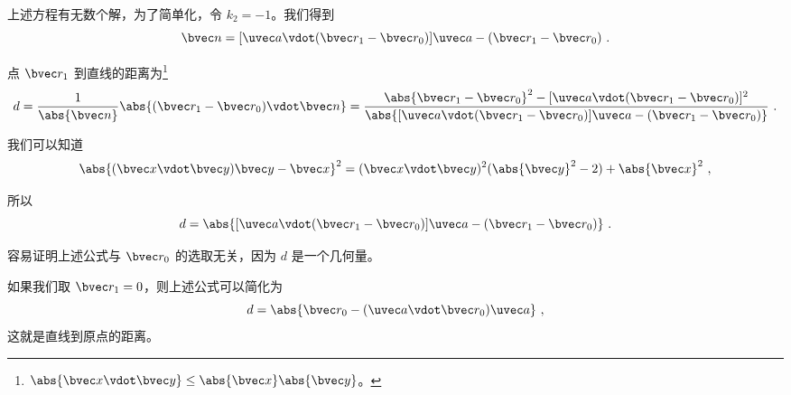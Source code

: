 上述方程有无数个解，为了简单化，令 $k_2 = -1$。我们得到
\begin{equation}
\bvec n = [\uvec a \vdot (\bvec r_1 -\bvec r_0)]\uvec a - (\bvec r_1 - \bvec r_0)~.
\end{equation}

点 $\bvec r_1$ 到直线的距离为\footnote{$\abs{\bvec x \vdot \bvec y}\leq \abs{\bvec x}\abs{\bvec y}$。}
\begin{equation}
d=\frac{1}{\abs{\bvec n}}\abs{(\bvec r_1 - \bvec r_0) \vdot \bvec n}=\frac{\abs{\bvec r_1 - \bvec r_0}^2 - [\uvec a \vdot (\bvec r_1 - \bvec r_0)]^2
}{\abs{[\uvec a \vdot (\bvec r_1 - \bvec r_0)]\uvec a - (\bvec r_1 - \bvec r_0)}}~.
\end{equation}

我们可以知道
\begin{equation}
\abs{(\bvec x \vdot \bvec y)\bvec y - \bvec x}^2=(\bvec x \vdot \bvec y)^2 (\abs{\bvec y}^2-2) + \abs{\bvec x}^2~,
\end{equation}

所以
\begin{equation}
d=\abs{[\uvec a \vdot (\bvec r_1 - \bvec r_0)]\uvec a - (\bvec r_1 - \bvec r_0)}~.
\end{equation}

容易证明上述公式与 $\bvec r_0$ 的选取无关，因为 $d$ 是一个几何量。

如果我们取 $\bvec r_1=0$，则上述公式可以简化为
\begin{equation}
d=\abs{\bvec r_0 - (\uvec a \vdot \bvec r_0)\uvec a}~,
\end{equation}
这就是直线到原点的距离。

